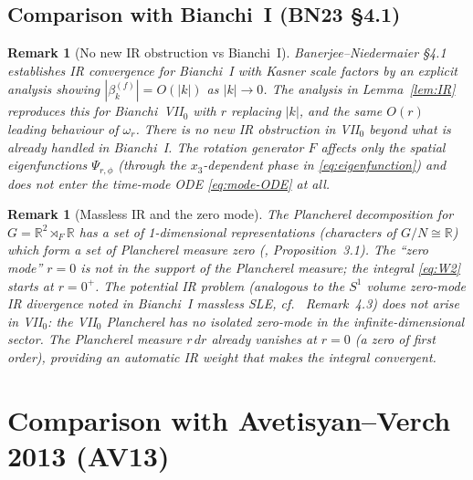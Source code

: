 \documentclass[12pt, a4paper]{article}
\newtheorem{remark}[theorem]{Remark}
\theoremstyle{remark}
\newcommand{\bR}{\mathbb{R}}
\newcommand{\semidp}{\rtimes}
\begin{document}
\subsection{Comparison with Bianchi~I (BN23 §4.1)}

\begin{remark}[No new IR obstruction vs Bianchi~I]\label{rem:BN23-IR}
  Banerjee--Niedermaier \cite{BN23} §4.1 establishes IR convergence for
  Bianchi~I with Kasner scale factors by an explicit analysis showing
  $|\beta_k^{(f)}| = O(|k|)$ as $|k| \to 0$.
  The analysis in Lemma~\ref{lem:IR} reproduces this for Bianchi~VII$_0$
  with $r$ replacing $|k|$, and the same $O(r)$ leading behaviour of $\omega_r$.
  There is no new IR obstruction in VII$_0$ beyond what is already handled
  in Bianchi~I.  The rotation generator $F$ affects only the spatial
  eigenfunctions $\Psi_{r,\phi}$ (through the $x_3$-dependent phase
  in \eqref{eq:eigenfunction}) and does not enter the time-mode ODE
  \eqref{eq:mode-ODE} at all.
\end{remark}

\begin{remark}[Massless IR and the zero mode]\label{rem:zero-mode}
  The Plancherel decomposition for $G = \bR^2 \semidp_F \bR$ has a
  set of 1-dimensional representations (characters of $G/N \cong \bR$)
  which form a set of Plancherel measure \emph{zero} (\cite{AV13},
  Proposition~3.1).  The ``zero mode'' $r = 0$ is not in the support
  of the Plancherel measure; the integral \eqref{eq:W2} starts at $r = 0^+$.
  The potential IR problem (analogous to the $S^1$ volume zero-mode
  IR divergence noted in Bianchi~I massless SLE, cf.\ \cite{BN23} Remark~4.3)
  does \emph{not} arise in VII$_0$: the VII$_0$ Plancherel has no isolated
  zero-mode in the infinite-dimensional sector.  The Plancherel measure $r\,dr$
  already vanishes at $r = 0$ (a zero of first order), providing an automatic
  IR weight that makes the integral convergent.
\end{remark}

\section{Comparison with Avetisyan--Verch 2013 (AV13)}
\label{sec:AV13}
\end{document}
